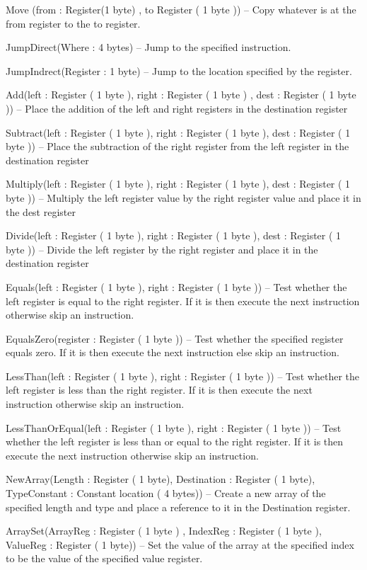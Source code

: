 \documentclass[]{final_report}
\begin{document}
Move (from : Register(1 byte) , to Register ( 1 byte )) – Copy whatever is at the from register to the
to register.

JumpDirect(Where : 4 bytes) – Jump to the specified instruction.

JumpIndrect(Register : 1 byte) – Jump to the location specified by the register.

Add(left : Register ( 1 byte ), right : Register ( 1 byte ) , dest : Register ( 1 byte )) – Place the
addition of the left and right registers in the destination register

Subtract(left : Register ( 1 byte ), right : Register ( 1 byte ), dest : Register ( 1 byte )) – Place the
subtraction of the right register from the left register in the destination register

Multiply(left : Register ( 1 byte ), right : Register ( 1 byte ), dest : Register ( 1 byte )) – Multiply
the left register value by the right register value and place it in the dest register

Divide(left : Register ( 1 byte ), right : Register ( 1 byte ), dest : Register ( 1 byte )) – Divide the
left register by the right register and place it in the destination register

Equals(left : Register ( 1 byte ), right : Register ( 1 byte )) – Test whether the left register is equal
to the right register. If it is then execute the next instruction otherwise skip an instruction.

EqualsZero(register : Register ( 1 byte )) – Test whether the specified register equals zero. If it is
then execute the next instruction else skip an instruction.

LessThan(left : Register ( 1 byte ), right : Register ( 1 byte )) – Test whether the left register is less
than the right register. If it is then execute the next instruction otherwise skip an instruction.

LessThanOrEqual(left : Register ( 1 byte ), right : Register ( 1 byte )) – Test whether the left
register is less than or equal to the right register. If it is then execute the next instruction otherwise
skip an instruction.

NewArray(Length : Register ( 1 byte), Destination : Register ( 1 byte), TypeConstant : Constant
location ( 4 bytes)) – Create a new array of the specified length and type and place a reference to it
in the Destination register.

ArraySet(ArrayReg : Register ( 1 byte ) , IndexReg : Register ( 1 byte ), ValueReg : Register ( 1
byte)) – Set the value of the array at the specified index to be the value of the specified value
register.
\end{document}

